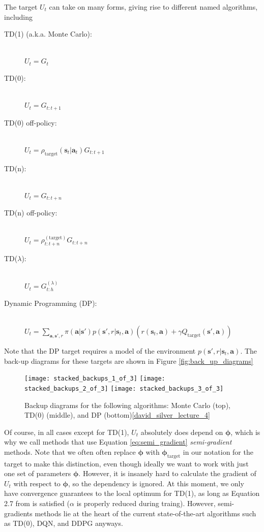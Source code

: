 \documentclass{article}
\begin{document}
The target $U_t$ can take on many forms, giving rise to different named algorithms, including
 \begin{description}
\item[TD(1) (a.k.a. Monte Carlo):]\hfill \\ 
$U_t=G_t$
\item[TD(0):]\hfill \\ 
$U_t=G_{t:t+1}$
\item[TD(0) off-policy:]\hfill \\ 
$U_t=\rho_\text{target}(\mathbf{s}_t|\mathbf{a}_t)G_{t:t+1}$
\item[TD(n):]\hfill \\
$U_t=G_{t:t+n}$
\item[TD(n) off-policy:]\hfill \\ 
$U_t=\rho_{t:t+n}^{(\text{target})}G_{t:t+n}$
\item[TD($\lambda$):]\hfill \\ 
$U_t=G_{t:h}^{(\lambda)}$
\item[Dynamic Programming (DP):]\hfill \\ 
$U_t=\sum_{\mathbf{a},\mathbf{s}',r}\pi(\mathbf{a}|\mathbf{s}')p(\mathbf{s}',r|\mathbf{s}_t,\mathbf{a})\left(r(\mathbf{s}_t,\mathbf{a})+\gamma Q_\text{target}(\mathbf{s}',\mathbf{a})\right)$
\end{description}Note that the DP target requires a model of the environment $p(\mathbf{s}',r|\mathbf{s}_t,\mathbf{a})$. The back-up diagrams for these targets are shown in Figure \ref{fig:back_up_diagrams}

\begin{figure}
\label{fig:back_up_diagrams}
    \begin{center}
    \texttt{[image: stacked\_backups\_1\_of\_3]}
    \texttt{[image: stacked\_backups\_2\_of\_3]}
    \texttt{[image: stacked\_backups\_3\_of\_3]}
    \caption{Backup diagrams for the following algorithms: Monte Carlo (top), TD(0) (middle), and DP (bottom)\ref{david_silver_lecture_4}}
    \label{fig:basis_small_width}
    \end{center}
\end{figure}

Of course, in all cases except for TD(1), $U_t$ absolutely does depend on $\boldsymbol{\phi}$, which is why we call methods that use Equation \ref{eq:semi_gradient} \textit{semi-gradient} methods. Note that we often often replace $\boldsymbol{\phi}$ with $\boldsymbol{\phi}_\text{target}$ in our notation for the target to make this distinction, even though ideally we want to work with just one set of parameters  $\boldsymbol{\phi}$. However, it is insanely hard to calculate the gradient of $U_t$ with respect to $\boldsymbol{\phi}$, so the dependency is ignored. At this moment, we only have convergence guarantees to the local optimum for TD(1), as long as Equation 2.7 from \cite{sutton_barto_rl} is satisfied ($\alpha$ is properly reduced during traing). However, semi-gradients methods lie at the heart of the current state-of-the-art algorithms such as TD(0), DQN\cite{bootstrap_DQN}, and DDPG\cite{ddpg} anyways. 
\end{document}

